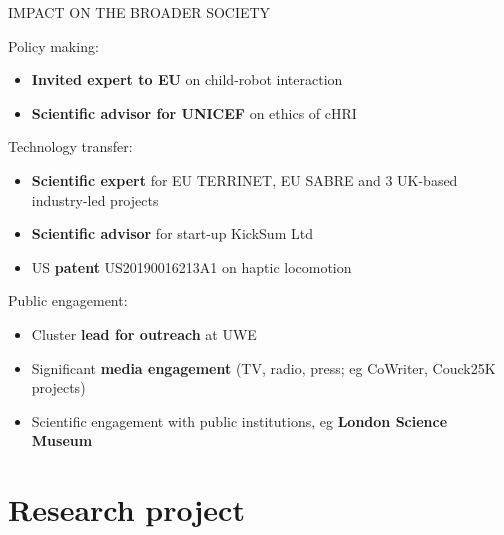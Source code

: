 \documentclass[xcolor=table]{beamer}
\makeatletter
\let\beamer@writeslidentry@miniframeson=\beamer@writeslidentry
\def\beamer@writeslidentry@miniframesoff{%
  \expandafter\beamer@ifempty\expandafter{\beamer@framestartpage}{}%
  {%
    \clearpage\beamer@notesactions%
  }
}
\newcommand*{\miniframeson}{\let\beamer@writeslidentry=\beamer@writeslidentry@miniframeson}
\newcommand*{\miniframesoff}{\let\beamer@writeslidentry=\beamer@writeslidentry@miniframesoff}
\makeatother
\begin{document}
\begin{frame}{IMPACT ON THE BROADER SOCIETY}

    Policy making:

    \begin{itemize}
        \item \textbf{Invited expert to EU} on child-robot interaction
        \item \textbf{Scientific advisor for UNICEF} on ethics of cHRI
    \end{itemize}

    Technology transfer:
    \begin{itemize}
        \item \textbf{Scientific expert} for EU TERRINET, EU SABRE and 3 UK-based
            industry-led projects
        \item \textbf{Scientific advisor} for start-up KickSum Ltd
        \item US \textbf{patent} US20190016213A1 on haptic locomotion
    \end{itemize}

    Public engagement:
    \begin{itemize}
        \item Cluster \textbf{lead for outreach} at UWE
        \item Significant \textbf{media engagement} (TV, radio, press; eg CoWriter, Couck25K projects)
        \item Scientific engagement with public institutions, eg \textbf{London
            Science Museum}
    \end{itemize}

\end{frame}


\miniframesoff{}

\miniframeson{}

\section*{Research project}
\end{document}

